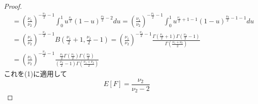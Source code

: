 \begin{proof}
\begin{align*}
                &= \left(\frac{\nu_1}{\nu_2}\right)^{-\frac{\nu_1}{2}-1}\int_{0}^{1}{u^{\frac{\nu_1}{2}}(1-u)^{\frac{\nu_2}{2}-2} du} = \left(\frac{\nu_1}{\nu_2}\right)^{-\frac{\nu_1}{2}-1}\int_{0}^{1}{u^{\frac{\nu_1}{2}+1-1}(1-u)^{\frac{\nu_2}{2}-1-1} du}\\
                &= \left(\frac{\nu_1}{\nu_2}\right)^{-\frac{\nu_1}{2}-1}B\left(\frac{\nu_1}{2}+1,\frac{\nu_2}{2}-1\right) = \left(\frac{\nu_1}{\nu_2}\right)^{-\frac{\nu_1}{2}-1}\frac{\Gamma{\left(\frac{\nu_1}{2}+1\right)}\Gamma{\left(\frac{\nu_2}{2}-1\right)}}{\Gamma{\left(\frac{\nu_1+\nu_2}{2}\right)}}\\
                &= \left(\frac{\nu_1}{\nu_2}\right)^{-\frac{\nu_1}{2}-1}\frac{\frac{\nu_1}{2}\Gamma{\left(\frac{\nu_1}{2}\right)}\Gamma{\left(\frac{\nu_2}{2}\right)}}{\left(\frac{\nu_2}{2}-1\right)\Gamma{\left(\frac{\nu_1+\nu_2}{2}\right)}}
            \end{align*}
            これを(1)に適用して
            \[E[F] = \frac{\nu_2}{\nu_2-2}\]
        \end{proof}
